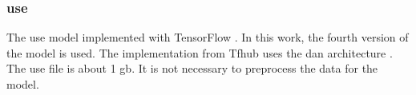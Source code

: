 \subsubsection*{\ac{use}}\label{subsubsec:impl-use}

The \ac{use} model implemented with TensorFlow \cite{HfsentTrans2019}.
In this work, the fourth version of the model is used.
The implementation from Tfhub uses the \ac{dan} architecture \cite{UniversalSentEnc-dev}.
The \ac{use} file is about 1 \ac{gb}. %
It is not necessary to preprocess the data for the model.